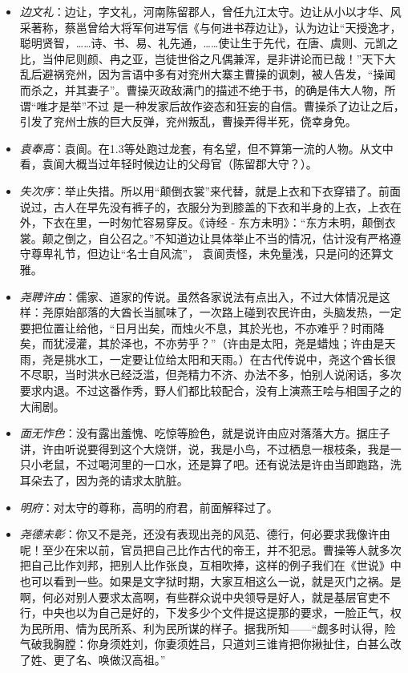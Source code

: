 \documentclass[]{book}
\providecommand{\tightlist}{%
  \setlength{\itemsep}{0pt}\setlength{\parskip}{0pt}}
\begin{document}
\begin{itemize}
\tightlist
\item
  \emph{边文礼}：边让，字文礼，河南陈留郡人，曾任九江太守。边让从小以才华、风采著称，蔡邕曾给大将军何进写信《与何进书荐边让》，认为边让``天授逸才，聪明贤智，\ldots{}\ldots{}诗、书、易、礼先通，\ldots{}\ldots{}使让生于先代，在唐、虞则、元凯之比，当仲尼则颜、冉之亚，岂徒世俗之凡偶兼浑，是非讲论而已哉！''天下大乱后避祸兖州，因为言语中多有对兖州大寨主曹操的讽刺，被人告发，``操闻而杀之，并其妻子''。曹操灭政敌满门的描述不绝于书，的确是伟大人物，所谓``唯才是举''不过
  是一种发家后故作姿态和狂妄的自信。曹操杀了边让之后，引发了兖州士族的巨大反弹，兖州叛乱，曹操弄得半死，侥幸身免。
\item
  \emph{袁奉高}：袁阆。在1.3等处跑过龙套，有名望，但不算第一流的人物。从文中看，袁阆大概当过年轻时候边让的父母官（陈留郡大守？）。
\item
  \emph{失次序}：举止失措。所以用``颠倒衣裳''来代替，就是上衣和下衣穿错了。前面说过，古人在早先没有裤子的，衣服分为到膝盖的下衣和半身的上衣，上衣在外，下衣在里，一时匆忙容易穿反。《诗经
  -
  东方未明》：``东方未明，颠倒衣裳。颠之倒之，自公召之。''不知道边让具体举止不当的情况，估计没有严格遵守尊卑礼节，但边让``名士自风流''，
  袁阆责怪，未免量浅，只是问的还算文雅。
\item
  \emph{尧聘许由}：儒家、道家的传说。虽然各家说法有点出入，不过大体情况是这样：尧原始部落的大酋长当腻味了，一次路上碰到农民许由，头脑发热，一定要把位置让给他，``日月出矣，而烛火不息，其於光也，不亦难乎？时雨降矣，而犹浸灌，其於泽也，不亦劳乎？''（许由是太阳，尧是蜡烛；许由是天雨，尧是挑水工，一定要让位给太阳和天雨。）在古代传说中，尧这个酋长很不尽职，当时洪水已经泛滥，但尧精力不济、办法不多，怕别人说闲话，多次要求内退。不过这番作秀，野人们都比较配合，没有上演燕王哙与相国子之的大闹剧。
\item
  \emph{面无怍色}：没有露出羞愧、吃惊等脸色，就是说许由应对落落大方。据庄子讲，许由听说要得到这个大烧饼，说，我是小鸟，不过栖息一根枝条，我是一只小老鼠，不过喝河里的一口水，还是算了吧。还有说法是许由当即跑路，洗耳朵去了，因为尧的请求太肮脏。
\item
  \emph{明府}：对太守的尊称，高明的府君，前面解释过了。
\item
  \emph{尧德未彰}：你又不是尧，还没有表现出尧的风范、德行，何必要求我像许由呢！至少在宋以前，官员把自己比作古代的帝王，并不犯忌。曹操等人就多次把自己比作刘邦，把别人比作张良，互相吹捧，这样的例子我们在《世说》中也可以看到一些。如果是文字狱时期，大家互相这么一说，就是灭门之祸。是啊，何必对别人要求太高啊，有些群众说中央领导是好人，就是基层官吏不行，中央也以为自己是好的，下发多少个文件提这提那的要求，一脸正气，权为民所用、情为民所系、利为民所谋的样子。据我所知------``觑多时认得，险气破我胸膛：你身须姓刘，你妻须姓吕，只道刘三谁肯把你揪扯住，白甚么改了姓、更了名、唤做汉高祖。''
\end{itemize}
\end{document}
